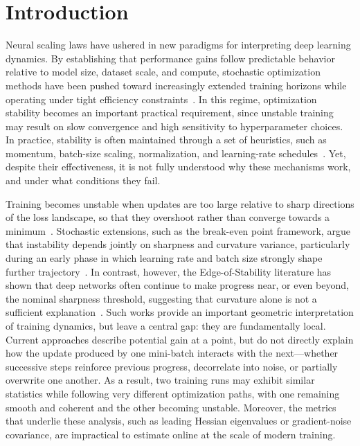 \section{Introduction}

Neural scaling laws have ushered in new paradigms for interpreting deep learning dynamics. By establishing that performance gains follow predictable behavior relative to model size, dataset scale, and compute, stochastic optimization methods have been pushed toward increasingly extended training horizons while operating under tight efficiency constraints~\cite{hestness2017deep, kaplan2020scaling, henighan2020scaling, hoffmann2022chinchilla}. In this regime, optimization stability becomes an important practical requirement, since unstable training may result on slow convergence and high sensitivity to hyperparameter choices. In practice, stability is often maintained through a set of heuristics, such as momentum, batch-size scaling, normalization, and learning-rate schedules~\cite{goyal2017accurate, smith2017cyclical, loshchilov2016sgdr, ioffe2015batch, krogh1991simple}. Yet, despite their effectiveness, it is not fully understood why these mechanisms work, and under what conditions they fail.

Training becomes unstable when updates are too large relative to sharp directions of the loss landscape, so that they overshoot rather than converge towards a minimum~\cite{polyak1964methods, bertsekas1997nonlinear}. Stochastic extensions, such as the break-even point framework, argue that instability depends jointly on sharpness and curvature variance, particularly during an early phase in which learning rate and batch size strongly shape further trajectory~\cite{jastrzebski2020break}. In contrast, however, the Edge-of-Stability literature has shown that deep networks often continue to make progress near, or even beyond, the nominal sharpness threshold, suggesting that curvature alone is not a sufficient explanation~\cite{cohen2021edge, arora2022understanding, damian2023self}. Such works provide an important geometric interpretation of training dynamics, but leave a central gap: they are fundamentally local. Current approaches describe potential gain at a point, but do not directly explain how the update produced by one mini-batch interacts with the next---whether successive steps reinforce previous progress, decorrelate into noise, or partially overwrite one another. As a result, two training runs may exhibit similar statistics while following very different optimization paths, with one remaining smooth and coherent and the other becoming unstable. Moreover, the metrics that underlie these analysis, such as leading Hessian eigenvalues or gradient-noise covariance, are impractical to estimate online at the scale of modern training.

